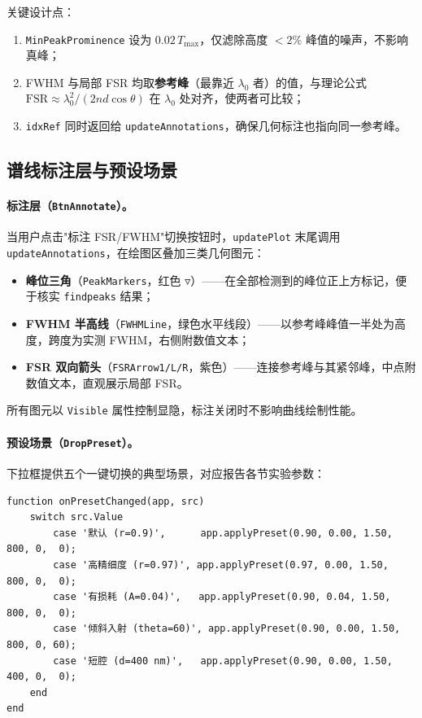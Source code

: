 \documentclass[10.5pt]{config}
\begin{document}
\noindent 关键设计点：
\begin{enumerate}
    \item \texttt{MinPeakProminence} 设为 $0.02\,T_{\max}$，仅滤除高度 $<2\%$ 峰值的噪声，不影响真峰；
    \item FWHM 与局部 FSR 均取\textbf{参考峰}（最靠近 $\lambda_0$ 者）的值，与理论公式 $\mathrm{FSR}\approx\lambda_0^2/(2nd\cos\theta)$ 在 $\lambda_0$ 处对齐，使两者可比较；
    \item \texttt{idxRef} 同时返回给 \texttt{updateAnnotations}，确保几何标注也指向同一参考峰。
\end{enumerate}

\subsection{谱线标注层与预设场景}

\paragraph{标注层（\texttt{BtnAnnotate}）。} 当用户点击"标注 FSR/FWHM"切换按钮时，\texttt{updatePlot} 末尾调用 \texttt{updateAnnotations}，在绘图区叠加三类几何图元：

\begin{itemize}
    \item \textbf{峰位三角}（\texttt{PeakMarkers}，红色 $\mathbf{\triangledown}$）——在全部检测到的峰位正上方标记，便于核实 \texttt{findpeaks} 结果；
    \item \textbf{FWHM 半高线}（\texttt{FWHMLine}，绿色水平线段）——以参考峰峰值一半处为高度，跨度为实测 FWHM，右侧附数值文本；
    \item \textbf{FSR 双向箭头}（\texttt{FSRArrow1/L/R}，紫色）——连接参考峰与其紧邻峰，中点附数值文本，直观展示局部 FSR。
\end{itemize}

\noindent 所有图元以 \texttt{Visible} 属性控制显隐，标注关闭时不影响曲线绘制性能。

\paragraph{预设场景（\texttt{DropPreset}）。} 下拉框提供五个一键切换的典型场景，对应报告各节实验参数：

\begin{listing}[H]
\begin{verbatim}
function onPresetChanged(app, src)
    switch src.Value
        case '默认 (r=0.9)',      app.applyPreset(0.90, 0.00, 1.50, 800, 0,  0);
        case '高精细度 (r=0.97)', app.applyPreset(0.97, 0.00, 1.50, 800, 0,  0);
        case '有损耗 (A=0.04)',   app.applyPreset(0.90, 0.04, 1.50, 800, 0,  0);
        case '倾斜入射 (theta=60)', app.applyPreset(0.90, 0.00, 1.50, 800, 0, 60);
        case '短腔 (d=400 nm)',   app.applyPreset(0.90, 0.00, 1.50, 400, 0,  0);
    end
end
\end{verbatim}
\caption{\texttt{onPresetChanged}：将下拉框选中的场景名映射为六参数组合，调用 \texttt{applyPreset} 批量写入滑块与数值框后触发重绘}
\end{listing}
\end{document}
